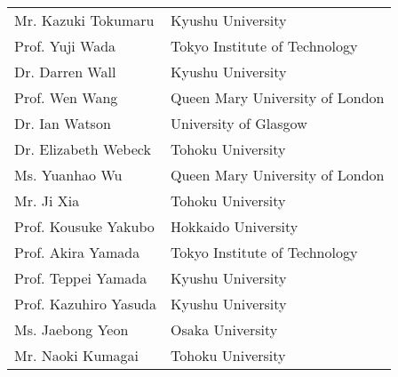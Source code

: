 \begin{longtable}{ll}
Mr. Kazuki Tokumaru & Kyushu University \\
Prof. Yuji Wada & Tokyo Institute of Technology \\
Dr. Darren Wall & Kyushu University \\
Prof. Wen Wang & Queen Mary University of London \\
Dr. Ian Watson & University of Glasgow \\
Dr. Elizabeth Webeck & Tohoku University \\
Ms. Yuanhao Wu & Queen Mary University of London \\
Mr. Ji Xia & Tohoku University \\
Prof. Kousuke Yakubo & Hokkaido University \\
Prof. Akira Yamada & Tokyo Institute of Technology \\
Prof. Teppei Yamada & Kyushu University \\
Prof. Kazuhiro Yasuda & Kyushu University \\
Ms. Jaebong Yeon & Osaka University \\
Mr. Naoki Kumagai & Tohoku University \\

\end{longtable}
